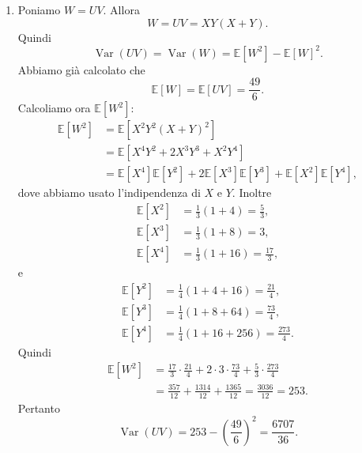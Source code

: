 \documentclass[a4paper]{article}
\begin{document}
\begin{snippetsolution}{}
\begin{enumerate}
\[            \]
        \item Poniamo \(W = UV\). Allora
            \[
                W = UV = XY(X+Y).
            \]
            Quindi
            \[
                \operatorname{Var}(UV)
                =
                \operatorname{Var}(W)
                =
                \mathbb E[W^2] - \mathbb E[W]^2.
            \]
            Abbiamo già calcolato che
            \[
                \mathbb E[W] = \mathbb E[UV] = \frac{49}{6}.
            \]
            Calcoliamo ora \(\mathbb E[W^2]\):
            \begin{align*}
                \mathbb E[W^2]
                &= \mathbb E\left[X^2Y^2(X+Y)^2\right] \\
                &= \mathbb E\left[X^4Y^2 + 2X^3Y^3 + X^2Y^4\right] \\
                &= \mathbb E[X^4]\mathbb E[Y^2]
                + 2\mathbb E[X^3]\mathbb E[Y^3]
                + \mathbb E[X^2]\mathbb E[Y^4],
            \end{align*}
            dove abbiamo usato l'indipendenza di \(X\) e \(Y\). Inoltre
            \begin{align*}
                \mathbb E[X^2] &= \frac13(1+4) = \frac53, \\
                \mathbb E[X^3] &= \frac13(1+8) = 3, \\
                \mathbb E[X^4] &= \frac13(1+16) = \frac{17}{3},
            \end{align*}
            e
            \begin{align*}
                \mathbb E[Y^2] &= \frac14(1+4+16) = \frac{21}{4}, \\
                \mathbb E[Y^3] &= \frac14(1+8+64) = \frac{73}{4}, \\
                \mathbb E[Y^4] &= \frac14(1+16+256) = \frac{273}{4}.
            \end{align*}
            Quindi
            \begin{align*}
                \mathbb E[W^2]
                &=
                \frac{17}{3}\cdot \frac{21}{4}
                + 2 \cdot 3 \cdot \frac{73}{4}
                + \frac53 \cdot \frac{273}{4} \\
                &=
                \frac{357}{12}
                + \frac{1314}{12}
                + \frac{1365}{12}
                =
                \frac{3036}{12}
                =
                253.
            \end{align*}
            Pertanto
            \[
                \operatorname{Var}(UV)
                =
                253 - \left(\frac{49}{6}\right)^2
                =
                \frac{6707}{36}.
            \]
    \end{enumerate}
\end{snippetsolution}
\end{document}
